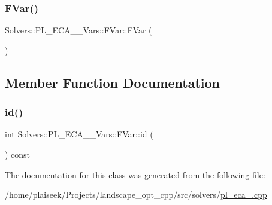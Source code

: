 \subsubsection{\texorpdfstring{F\+Var()}{FVar()}}
{\footnotesize\ttfamily Solvers\+::\+P\+L\+\_\+\+E\+C\+A\+\_\+\_\+\+Vars\+::\+F\+Var\+::\+F\+Var (\begin{DoxyParamCaption}{ }\end{DoxyParamCaption})\hspace{0.3cm}{\ttfamily [inline]}}



\subsection{Member Function Documentation}
\mbox{\label{class_solvers_1_1_p_l___e_c_a__3___vars_1_1_f_var_a4f84286d12212ae32eb4c8fde3f8916f}} 
\subsubsection{\texorpdfstring{id()}{id()}}
{\footnotesize\ttfamily int Solvers\+::\+P\+L\+\_\+\+E\+C\+A\+\_\+\_\+\+Vars\+::\+F\+Var\+::id (\begin{DoxyParamCaption}{ }\end{DoxyParamCaption}) const\hspace{0.3cm}{\ttfamily [inline]}}



The documentation for this class was generated from the following file\+:\begin{DoxyCompactItemize}
\item 
/home/plaiseek/\+Projects/landscape\+\_\+opt\+\_\+cpp/src/solvers/\hyperlink{pl__eca__3_8cpp}{pl\+\_\+eca\+\_.\+cpp}\end{DoxyCompactItemize}

